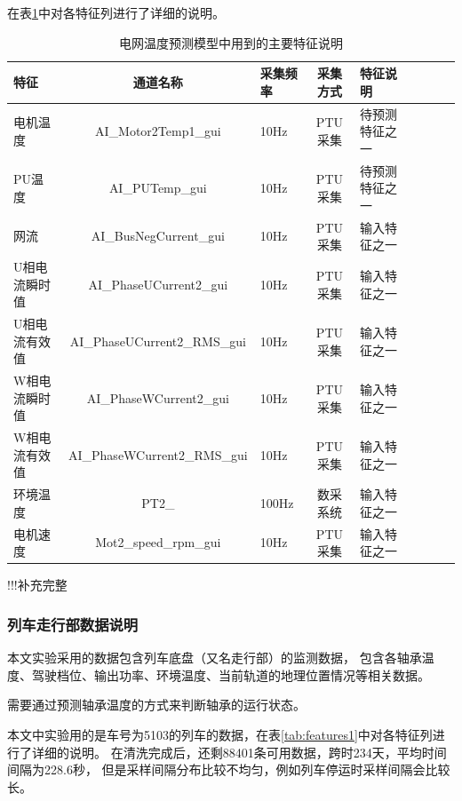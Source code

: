     在表\ref{tab:features2}中对各特征列进行了详细的说明。
    \begin{table}
        \centering
        \caption{电网温度预测模型中用到的主要特征说明}
        \begin{tabular}{lclclclcl}
          \toprule
          特征    & 通道名称 &采集频率&采集方式 &特征说明                                       \\
          \midrule
          电机温度   & AI\_Motor2Temp1\_gui &10Hz &PTU采集 & 待预测特征之一\\
          PU温度   & AI\_PUTemp\_gui &10Hz &PTU采集 & 待预测特征之一\\
          网流   & AI\_BusNegCurrent\_gui &10Hz &PTU采集 & 输入特征之一\\
          U相电流瞬时值   & AI\_PhaseUCurrent2\_gui &10Hz &PTU采集 & 输入特征之一\\
          U相电流有效值   & AI\_PhaseUCurrent2\_RMS\_gui &10Hz &PTU采集 & 输入特征之一\\
          W相电流瞬时值   & AI\_PhaseWCurrent2\_gui &10Hz &PTU采集 & 输入特征之一\\
          W相电流有效值   & AI\_PhaseWCurrent2\_RMS\_gui &10Hz &PTU采集 & 输入特征之一\\
          环境温度   & PT2\_ &100Hz &数采系统 & 输入特征之一\\
          电机速度   & Mot2\_speed\_rpm\_gui &10Hz &PTU采集 & 输入特征之一\\
          
          \bottomrule
        \end{tabular}
        \label{tab:features2}
      \end{table}
    !!!补充完整
  \subsubsection{列车走行部数据说明}
    本文实验采用的数据包含列车底盘（又名走行部）的监测数据，
    包含各轴承温度、驾驶档位、输出功率、环境温度、当前轨道的地理位置情况等相关数据。

    需要通过预测轴承温度的方式来判断轴承的运行状态。

    本文中实验用的是车号为5103的列车的数据，在表\ref{tab:features1}中对各特征列进行了详细的说明。
    在清洗完成后，还剩88401条可用数据，跨时234天，平均时间间隔为228.6秒，
    但是采样间隔分布比较不均匀，例如列车停运时采样间隔会比较长。

